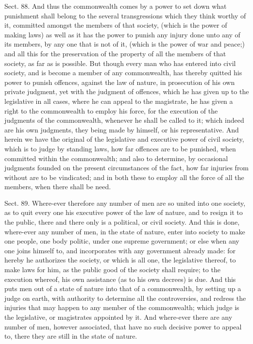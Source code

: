 \documentclass[11pt,openany]{book}
\begin{document}
Sect. 88. And thus the commonwealth comes by a power to set down what punishment shall belong to the several transgressions which they think worthy of it, committed amongst the members of that society, (which is the power of making laws) as well as it has the power to punish any injury done unto any of its members, by any one that is not of it, (which is the power of war and peace;) and all this for the preservation of the property of all the members of that society, as far as is possible. But though every man who has entered into civil society, and is become a member of any commonwealth, has thereby quitted his power to punish offences, against the law of nature, in prosecution of his own private judgment, yet with the judgment of offences, which he has given up to the legislative in all cases, where he can appeal to the magistrate, he has given a right to the commonwealth to employ his force, for the execution of the judgments of the commonwealth, whenever he shall be called to it; which indeed are his own judgments, they being made by himself, or his representative. And herein we have the original of the legislative and executive power of civil society, which is to judge by standing laws, how far offences are to be punished, when committed within the commonwealth; and also to determine, by occasional judgments founded on the present circumstances of the fact, how far injuries from without are to be vindicated; and in both these to employ all the force of all the members, when there shall be need.

Sect. 89. Where-ever therefore any number of men are so united into one society, as to quit every one his executive power of the law of nature, and to resign it to the public, there and there only is a political, or civil society. And this is done, where-ever any number of men, in the state of nature, enter into society to make one people, one body politic, under one supreme government; or else when any one joins himself to, and incorporates with any government already made: for hereby he authorizes the society, or which is all one, the legislative thereof, to make laws for him, as the public good of the society shall require; to the execution whereof, his own assistance (as to his own decrees) is due. And this puts men out of a state of nature into that of a commonwealth, by setting up a judge on earth, with authority to determine all the controversies, and redress the injuries that may happen to any member of the commonwealth; which judge is the legislative, or magistrates appointed by it. And where-ever there are any number of men, however associated, that have no such decisive power to appeal to, there they are still in the state of nature.
\end{document}
